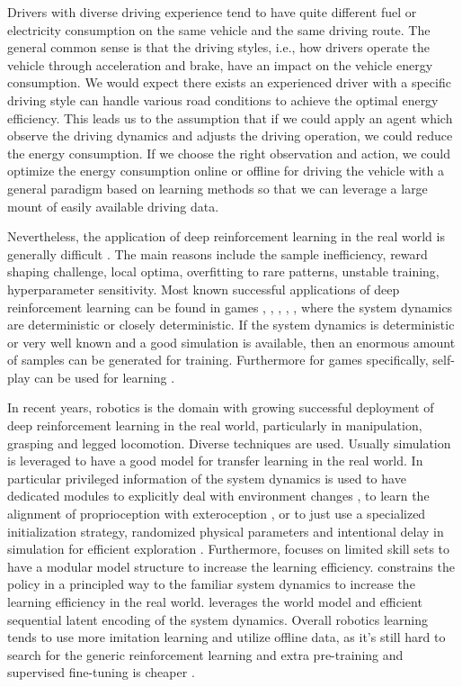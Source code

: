 \documentclass{article}
\begin{document}
Drivers with diverse driving experience tend to have quite different fuel or electricity consumption on the same vehicle and the same driving route. The general common sense is that the driving styles, i.e., how drivers operate the vehicle through acceleration and brake, have an impact on the vehicle energy consumption. We would expect there exists an experienced driver with a specific driving style can handle various road conditions to achieve the optimal energy efficiency. This leads us to the assumption that if we could apply an agent which observe the driving dynamics and adjusts the driving operation, we could reduce the energy consumption. If we choose the right observation and action, we could optimize the energy consumption online or offline for driving the vehicle with a general paradigm based on learning methods so that we can leverage a large mount of easily available driving data.

Nevertheless, the application of deep reinforcement learning in the real world is generally difficult \parencite{Irpan_2018}. The main reasons include the sample inefficiency, reward shaping challenge, local optima, overfitting to rare patterns, unstable training, hyperparameter sensitivity. Most known successful applications of deep reinforcement learning can be found in games \parencite{mnih13:_playin_atari_deep_reinf_learn}, \parencite{DBLP:journals/nature/SilverHMGSDSAPL16}, \parencite{DBLP:conf/ijcai/BrownS17}, \parencite{openai19:_dota_large_scale_deep_reinf_learn}, \parencite{bakhtin22:_Human_level_diplomacy_cicero}, where the system dynamics are deterministic or closely deterministic.
If the system dynamics is deterministic or very well known and a good simulation is available, then an enormous amount of samples can be generated for training. Furthermore for games specifically, self-play can be used for learning \parencite{Silver_2018}.

In recent years, robotics is the domain with growing successful deployment of deep reinforcement learning in the real world, particularly in manipulation, grasping and legged locomotion. Diverse techniques are used. Usually simulation is leveraged to have a good model for transfer learning in the real world. In particular privileged information of the system dynamics is used to have dedicated modules to explicitly deal with environment changes \parencite{kumar21:_rma}, to learn the alignment of proprioception with exteroception \parencite{Miki_2022}, or to just use a specialized initialization strategy, randomized physical parameters and intentional delay in simulation for efficient exploration \parencite{Song_2023}. Furthermore, \parencite{Hoeller_2024} focuses on limited skill sets to have a modular model structure to increase the learning efficiency. \parencite{smith23:_grow_your_limit} constrains the policy in a principled way to the familiar system dynamics to increase the learning efficiency in the real world. \parencite{wu22:_daydr} leverages the world model and efficient sequential latent encoding of the system dynamics. Overall robotics learning tends to use more imitation learning and utilize offline data, as it's still hard to search for the generic reinforcement learning and extra pre-training and supervised fine-tuning is cheaper \parencite{Irpan_2024}.
\end{document}
